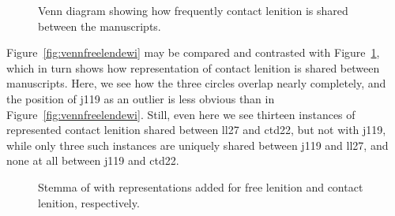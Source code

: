 \begin{figure}[h]
  \centering
  
  \caption{Venn diagram showing how frequently contact lenition is shared between  the manuscripts.}
  \label{fig:venncontlendewi}
\end{figure}

Figure~\ref{fig:vennfreelendewi} may be compared and contrasted with Figure~\ref{fig:venncontlendewi}, which in turn shows how representation of contact lenition is shared between manuscripts. Here, we see how the three circles overlap nearly completely, and the position of \gls{j119} as an outlier is less obvious than in Figure~\ref{fig:vennfreelendewi}. Still, even here we see thirteen instances of represented contact lenition shared between \gls{ll27} and \gls{ctd22}, but not with \gls{j119}, while only three such instances are uniquely  shared between \gls{j119} and \gls{ll27}, and none at all between \gls{j119} and \gls{ctd22}.

\begin{figure}[h]\centering
  \caption{Stemma of  with representations added for free lenition and contact lenition, respectively.}
\label{fig:stemmaadditionsfreecont}
\end{figure}



